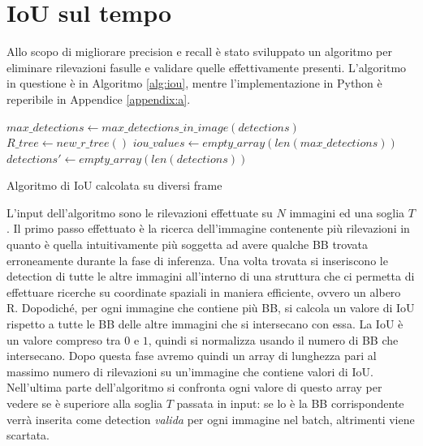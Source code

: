 \section{IoU sul tempo}
\label{sec:iou_over_time}
Allo scopo di migliorare precision e recall è stato sviluppato un algoritmo per eliminare rilevazioni fasulle e validare quelle effettivamente presenti. L'algoritmo in questione è in Algoritmo \ref{alg:iou}, mentre l'implementazione in Python è reperibile in Appendice \ref{appendix:a}.


\begin{algorithm}[H]
    \SetAlgoLined
    $ max\_detections \leftarrow max\_detections\_in\_image(detections)$ \;
    $ R\_tree \leftarrow new\_r\_tree() $\;
    $iou\_values \leftarrow empty\_array(len(max\_detections))$\;
    $detections' \leftarrow empty\_array(len(detections))$\;
    \caption{Algoritmo di IoU calcolata su diversi frame}
    \label{alg:iou}
\end{algorithm}

L'input dell'algoritmo sono le rilevazioni effettuate su $N$ immagini ed una soglia $T$. 
Il primo passo effettuato è la ricerca dell'immagine contenente più rilevazioni in quanto è quella intuitivamente più soggetta ad avere qualche \ac{BB} trovata erroneamente durante la fase di inferenza. Una volta trovata si inseriscono le detection di tutte le altre immagini all'interno di una struttura che ci permetta di effettuare ricerche su coordinate spaziali in maniera efficiente, ovvero un albero R.
Dopodiché, per ogni immagine che contiene più \ac{BB}, si calcola un valore di \ac{IoU} rispetto a tutte le \ac{BB} delle altre immagini che si intersecano con essa. La \ac{IoU} è un valore compreso tra $0$ e $1$, quindi si normalizza usando il numero di \ac{BB} che intersecano.
Dopo questa fase avremo quindi un array di lunghezza pari al massimo numero di rilevazioni su un'immagine che contiene valori di \ac{IoU}.
Nell'ultima parte dell'algoritmo si confronta ogni valore di questo array per vedere se è superiore alla soglia $T$ passata in input: se lo è la \ac{BB} corrispondente verrà inserita come detection \textit{valida} per ogni immagine nel batch, altrimenti viene scartata.

